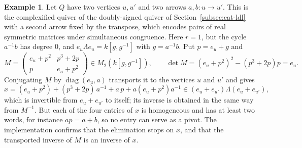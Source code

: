 \documentclass[12pt, a4paper]{report}
\theoremstyle{plain}
\theoremstyle{definition}
\newtheorem{example}[theorem]{Example}
\theoremstyle{remark}
\theoremstyle{plain}
\DeclareMathOperator{\diag}{diag}
\begin{document}
\begin{example}\label{ex:elimination-fails}
Let $Q$ have two vertices $u,u'$ and two arrows $a,b:u\to u'$. This is the complexified quiver of the doubly-signed quiver of Section~\ref{subsec:cat-ldl} with a second arrow fixed by the transpose, which encodes pairs of real symmetric matrices under simultaneous congruence. Here $r=1$, but the cycle $a^{-1}b$ has degree $0$, and $e_u\Lambda e_u=k[g,g^{-1}]$ with $g=a^{-1}b$. Put $p=e_u+g$ and
\[ M=\begin{pmatrix}e_u+p^2&p^3+2p\\ p&e_u+p^2\end{pmatrix}\in M_2(k[g,g^{-1}]),\qquad \det M=(e_u+p^2)^2-(p^3+2p)p=e_u . \]
Conjugating $M$ by $\diag(e_u,a)$ transports it to the vertices $u$ and $u'$ and gives
\[ x=(e_u+p^2)+(p^3+2p)\,a^{-1}+a\,p+a(e_u+p^2)a^{-1}\in(e_u+e_{u'})\Lambda(e_u+e_{u'}), \]
which is invertible from $e_u+e_{u'}$ to itself; its inverse is obtained in the same way from $M^{-1}$. But each of the four entries of $x$ is homogeneous and has at least two words, for instance $ap=a+b$, so no entry can serve as a pivot. The implementation confirms that the elimination stops on $x$, and that the transported inverse of $M$ is an inverse of $x$.
\end{example}
\end{document}
